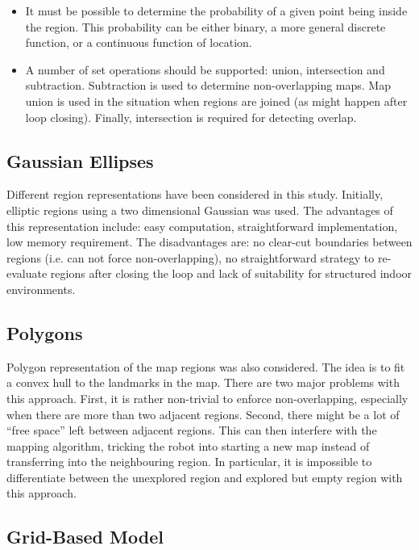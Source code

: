 \begin{itemize}
\item It must be possible to determine the probability of a given
  point being inside the region. This probability can be either
  binary, a more general discrete function, or a continuous function
  of location.
 
\item A number of set operations should be supported:
  union, intersection and subtraction. Subtraction is used to
  determine non-overlapping maps. Map union is used in the situation
  when regions are joined (as might happen after loop closing).
  Finally, intersection is required for detecting overlap.

\end{itemize}

\subsection{Gaussian Ellipses}

Different region representations have been considered in this study.
Initially, elliptic regions using a two dimensional Gaussian was used.
The advantages of this representation include: easy computation,
straightforward implementation, low memory requirement. The disadvantages
are: no clear-cut boundaries between regions (i.e. can not force
non-overlapping), no straightforward strategy to re-evaluate regions
after closing the loop and lack of suitability for structured indoor
environments.

\subsection{Polygons}

Polygon representation of the map regions was also considered. The
idea is to fit a convex hull to the landmarks in the map. There are
two major problems with this approach. First, it is rather non-trivial
to enforce non-overlapping, especially when there are more than two
adjacent regions. Second, there might be a lot of ``free space'' left
between adjacent regions. This can then interfere with the mapping
algorithm, tricking the robot into starting a new map instead of
transferring into the neighbouring region.  In particular, it is
impossible to differentiate between the unexplored region and explored
but empty region with this approach.

\subsection{Grid-Based Model}

